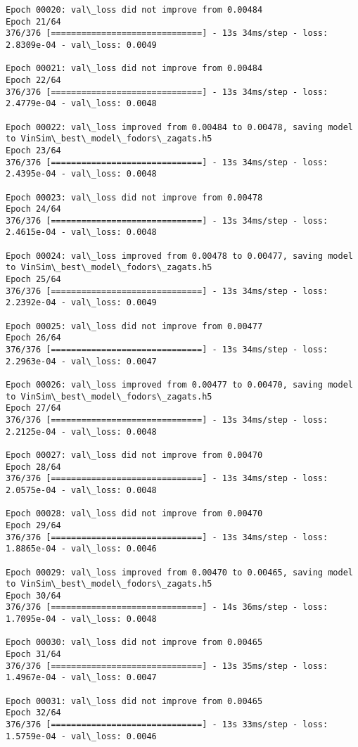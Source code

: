 \documentclass[11pt]{article}
\begin{document}
\begin{Verbatim}[commandchars=\\\{\}]
Epoch 00020: val\_loss did not improve from 0.00484
Epoch 21/64
376/376 [==============================] - 13s 34ms/step - loss: 2.8309e-04 - val\_loss: 0.0049

Epoch 00021: val\_loss did not improve from 0.00484
Epoch 22/64
376/376 [==============================] - 13s 34ms/step - loss: 2.4779e-04 - val\_loss: 0.0048

Epoch 00022: val\_loss improved from 0.00484 to 0.00478, saving model to VinSim\_best\_model\_fodors\_zagats.h5
Epoch 23/64
376/376 [==============================] - 13s 34ms/step - loss: 2.4395e-04 - val\_loss: 0.0048

Epoch 00023: val\_loss did not improve from 0.00478
Epoch 24/64
376/376 [==============================] - 13s 34ms/step - loss: 2.4615e-04 - val\_loss: 0.0048

Epoch 00024: val\_loss improved from 0.00478 to 0.00477, saving model to VinSim\_best\_model\_fodors\_zagats.h5
Epoch 25/64
376/376 [==============================] - 13s 34ms/step - loss: 2.2392e-04 - val\_loss: 0.0049

Epoch 00025: val\_loss did not improve from 0.00477
Epoch 26/64
376/376 [==============================] - 13s 34ms/step - loss: 2.2963e-04 - val\_loss: 0.0047

Epoch 00026: val\_loss improved from 0.00477 to 0.00470, saving model to VinSim\_best\_model\_fodors\_zagats.h5
Epoch 27/64
376/376 [==============================] - 13s 34ms/step - loss: 2.2125e-04 - val\_loss: 0.0048

Epoch 00027: val\_loss did not improve from 0.00470
Epoch 28/64
376/376 [==============================] - 13s 34ms/step - loss: 2.0575e-04 - val\_loss: 0.0048

Epoch 00028: val\_loss did not improve from 0.00470
Epoch 29/64
376/376 [==============================] - 13s 34ms/step - loss: 1.8865e-04 - val\_loss: 0.0046

Epoch 00029: val\_loss improved from 0.00470 to 0.00465, saving model to VinSim\_best\_model\_fodors\_zagats.h5
Epoch 30/64
376/376 [==============================] - 14s 36ms/step - loss: 1.7095e-04 - val\_loss: 0.0048

Epoch 00030: val\_loss did not improve from 0.00465
Epoch 31/64
376/376 [==============================] - 13s 35ms/step - loss: 1.4967e-04 - val\_loss: 0.0047

Epoch 00031: val\_loss did not improve from 0.00465
Epoch 32/64
376/376 [==============================] - 13s 33ms/step - loss: 1.5759e-04 - val\_loss: 0.0046


\end{Verbatim}
\end{document}
